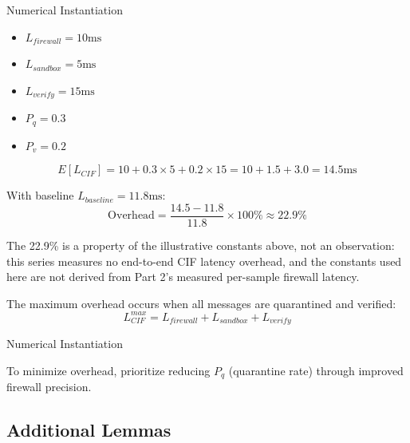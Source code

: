 \documentclass[
  ignorenonframetext,
]{beamer}
\begin{document}
\begin{frame}[allowframebreaks]{Numerical Instantiation}
\begin{itemize}
\item $L_{firewall} = 10\text{ms}$
\item $L_{sandbox} = 5\text{ms}$
\item $L_{verify} = 15\text{ms}$
\item $P_q = 0.3$
\item $P_v = 0.2$
\end{itemize}

\begin{equation}
\label{eq:numerical-instantiation}
E[L_{CIF}] = 10 + 0.3 \times 5 + 0.2 \times 15 = 10 + 1.5 + 3.0 = 14.5\text{ms}
\end{equation}

With baseline \(L_{baseline} = 11.8\text{ms}\): \begin{equation}
\label{eq:overhead-percent}
\text{Overhead} = \frac{14.5 - 11.8}{11.8} \times 100\% \approx 22.9\%
\end{equation}

The 22.9\% is a property of the illustrative constants above, not an
observation: this series measures no end-to-end CIF latency overhead,
and the constants used here are not derived from Part 2's measured
per-sample firewall latency.

\begin{corollary}
\label{cor:overhead-bound}
The maximum overhead occurs when all messages are quarantined and verified:
\begin{equation}
\label{eq:max-overhead}
L_{CIF}^{max} = L_{firewall} + L_{sandbox} + L_{verify}
\end{equation}
\end{corollary}

\end{frame}

\begin{frame}[allowframebreaks]{Numerical Instantiation}
\begin{corollary}
\label{cor:optimization-target}
To minimize overhead, prioritize reducing $P_q$ (quarantine rate) through improved firewall precision.
\end{corollary}
\end{frame}

\begin{frame}
\end{frame}

\subsection{Additional Lemmas}\label{sec:additional-lemmas}
\end{document}
